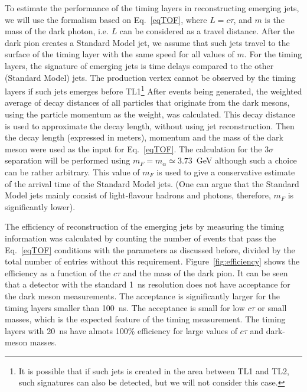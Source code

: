 To estimate the performance of the timing layers in reconstructing emerging jets, 
we will use the formalism based on Eq.~\ref{eqTOF}, where $L=c\tau$, and $m$ is the mass
of the dark photon, i.e. $L$ can be considered as a travel distance. After the dark pion creates a Standard Model jet, we assume that
such jets travel to the surface of the timing layer with the same speed for all values of $m$.
For the timing layers, the signature of emerging jets is time delays compared to the other (Standard Model) jets. The  production vertex
cannot be observed by the timing layers if such jets emerges before TL1\footnote{It is possible that if such jets is created in the area between TL1 and TL2,
such signatures can also be detected, but we will not consider this case.}
After events being generated, the weighted average of decay distances of all particles that originate from
the dark mesons, using the particle momentum as the weight, was calculated. This decay distance is used 
to approximate the decay length, without using jet reconstruction.  Then the decay length (expressed in meters),  
momentum and the mass of the dark meson were used as the input for Eq.~\ref{eqTOF}.
The  calculation for the $3\sigma$ separation will be performed using $m_F=m_{\alpha}\simeq 3.73$~GeV although such a choice can be rather arbitrary.
This value of $m_F$ is used to give a conservative estimate of the arrival time of the Standard Model jets. 
(One can argue that the Standard Model jets mainly consist of light-flavour hadrons and photons, therefore, $m_F$ is significantly lower). 

The efficiency of reconstruction of the emerging jets by measuring the timing information was calculated by counting the number of events that pass the 
Eq.~\ref{eqTOF} conditions  with the parameters as discussed before, divided by the total number of entries
without this requirement. Figure~\ref{fig:efficiency} shows the efficiency
as a function of the $c\tau$ and the mass of the dark pion. It can be seen that a detector with the standard 1~ns resolution does
not have acceptance for the dark meson measurements. The acceptance is significantly larger for the timing layers smaller than 100~ns.
The acceptance is small for low $c\tau$ or small masses, which is the expected feature of the timing measurement.
The timing layers with 20~ns have almots 100\% efficiency for large values of $c\tau$ and dark-meson masses.

